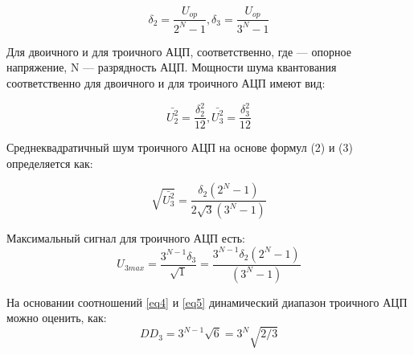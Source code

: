 \documentclass[10pt]{beamer}
\begin{document}
\begin{frame}[shrink=20,fragile]
\transdissolve[duration=0.2]
\begin{block}{}

\centering	
\begin{equation}
	\delta_{2} = \frac{U_{op}}{2^{N}-1}, \delta_{3} = \frac{U_{op}}{3^{N}-1}
	\end{equation}
	
	Для двоичного и для троичного АЦП, соответственно, где   — опорное напряжение, N — разрядность АЦП. Мощности шума квантования соответственно для двоичного и для троичного АЦП имеют вид:
	
	\begin{equation}
	\bar{U^{2}_{2}} = \frac{\delta^{2}_{2}}{12},\bar{U^{2}_{3}}=\frac{\delta^{2}_{3}}{12}
	\end{equation}
	
	Среднеквадратичный шум троичного АЦП на основе формул (2) и (3) определяется как:
	
	\begin{equation}
	\label{eq4}
	\sqrt{\bar{U^{2}_{3}}}=\frac{\delta_{2}(2^{N}-1)}{2\sqrt{3}(3^{N}-1)}
	\end{equation}
	
	Максимальный сигнал для троичного АЦП есть:
	\begin{equation}
	\label{eq5}
	U_{3max}=\frac{3^{N-1}\delta_{3}}{\sqrt{1}} = \frac{3^{N-1}\delta_{2}(2^{N}-1)}{(3^{N}-1)}
	\end{equation}
	
	На основании соотношений \ref{eq4} и \ref{eq5} динамический диапазон троичного АЦП можно оценить, как:
	\begin{equation}
	DD_{3}=3^{N-1}\sqrt{6}=3^{N}\sqrt{2/3}
	\end{equation}

\end{block}   

\end{frame}
\end{document}
